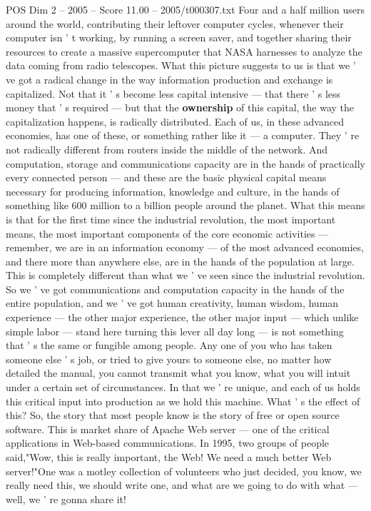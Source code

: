 \begin{textsample}{POS Dim 2 – 2005 – Score 11.00 – 2005/t000307.txt}
Four and a half million users around the world, contributing their leftover computer cycles, whenever their computer isn ' t working, by running a screen saver, and together sharing their resources to create a massive supercomputer that NASA harnesses to analyze the data coming from radio telescopes.
What this picture suggests to us is that we ' ve got a radical change in the way information production and exchange is capitalized.
Not that it ' s become less capital intensive — that there ' s less money that ' s required — but that the \textbf{ownership} of this capital, the way the capitalization happens, is radically distributed.
Each of us, in these advanced economies, has one of these, or something rather like it — a computer.
They ' re not radically different from routers inside the middle of the network.
And computation, storage and communications capacity are in the hands of practically every connected person — and these are the basic physical capital means necessary for producing information, knowledge and culture, in the hands of something like 600 million to a billion people around the planet.
What this means is that for the first time since the industrial revolution, the most important means, the most important components of the core economic activities — remember, we are in an information economy — of the most advanced economies, and there more than anywhere else, are in the hands of the population at large.
This is completely different than what we ' ve seen since the industrial revolution.
So we ' ve got communications and computation capacity in the hands of the entire population, and we ' ve got human creativity, human wisdom, human experience — the other major experience, the other major input — which unlike simple labor — stand here turning this lever all day long — is not something that ' s the same or fungible among people.
Any one of you who has taken someone else ' s job, or tried to give yours to someone else, no matter how detailed the manual, you cannot transmit what you know, what you will intuit under a certain set of circumstances.
In that we ' re unique, and each of us holds this critical input into production as we hold this machine.
What ' s the effect of this?
So, the story that most people know is the story of free or open source software.
This is market share of Apache Web server — one of the critical applications in Web-based communications.
In 1995, two groups of people said,"Wow, this is really important, the Web!
We need a much better Web server!"One was a motley collection of volunteers who just decided, you know, we really need this, we should write one, and what are we going to do with what — well, we ' re gonna share it!

\end{textsample}
